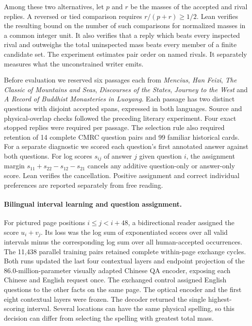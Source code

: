 \documentclass[12pt,a4paper]{article}
\providecommand{\DIFadd}[1]{{\protect\color{blue} \sf #1}} %
\begin{document}
\DIFadd{Among these two alternatives, let $p$ and $r$ be the masses of the accepted and rival replies. A reversed or tied comparison requires $r/(p+r)\geq 1/2$. Lean verifies the resulting bound on the number of such comparisons for normalized masses in a common integer unit. It also verifies that a reply which beats every inspected rival and outweighs the total uninspected mass beats every member of a finite candidate set. The experiment estimates pair order on named rivals. It separately measures what the unconstrained writer emits.
}

\DIFadd{Before evaluation we reserved six passages each from \emph{Mencius}, \emph{Han Feizi}, \emph{The Classic of Mountains and Seas}, \emph{Discourses of the States}, \emph{Journey to the West} and \emph{A Record of Buddhist Monasteries in Luoyang}. Each passage has two distinct questions with disjoint accepted spans, expressed in both languages. Source and physical-overlap checks followed the preceding literary experiment. Four exact stopped replies were required per passage. The selection rule also required retention of 14 complete CMRC question pairs and 99 familiar historical cards. For a separate diagnostic we scored each question's first annotated answer against both questions. For log scores $s_{ij}$ of answer $j$ given question $i$, the assignment margin $s_{11}+s_{22}-s_{12}-s_{21}$ cancels any additive question-only or answer-only score. Lean verifies the cancellation. Positive assignment and correct individual preferences are reported separately from free reading.
}

\paragraph{\DIFadd{Bilingual interval learning and question assignment.}}
\DIFadd{For pictured page positions $i\le j<i+48$, a bidirectional reader assigned the score $u_i+v_j$. Its loss was the log sum of exponentiated scores over all valid intervals minus the corresponding log sum over all human-accepted occurrences. The 11,438 parallel training pairs retained complete within-page exchange cycles. Both runs updated the last four contextual layers and endpoint projection of the 86.0-million-parameter visually adapted Chinese QA encoder, exposing each Chinese and English request once. The exchanged control assigned English questions to the other facts on the same page. The optical encoder and the first eight contextual layers were frozen. The decoder returned the single highest-scoring interval. Several locations can have the same physical spelling, so this decision can differ from selecting the spelling with greatest total mass.
}
\end{document}
